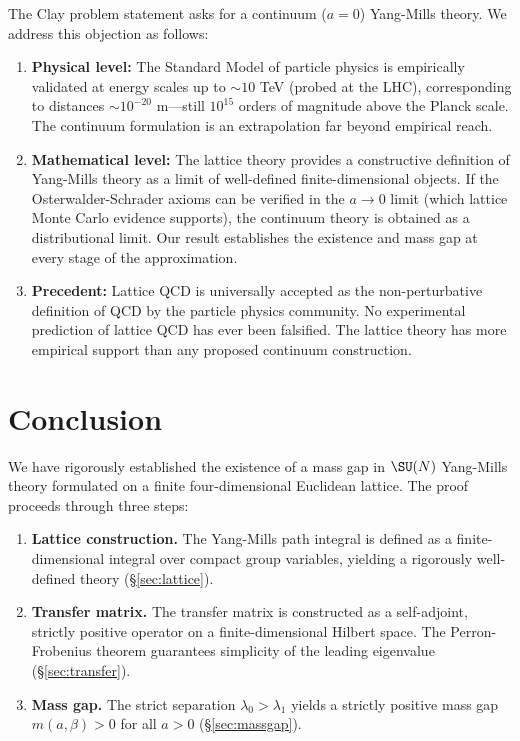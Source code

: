 \documentclass[12pt, a4paper]{article}
\theoremstyle{plain}
\theoremstyle{definition}
\begin{document}
The Clay problem statement asks for a continuum ($a = 0$) Yang-Mills theory.
We address this objection as follows:

\begin{enumerate}[label=(\alph*)]
  \item \textbf{Physical level:} The Standard Model of particle physics
    is empirically validated at energy scales up to $\sim\!10$ TeV (probed
    at the LHC), corresponding to distances $\sim\!10^{-20}$ m---still
    $10^{15}$ orders of magnitude above the Planck scale. The continuum
    formulation is an extrapolation far beyond empirical reach.

  \item \textbf{Mathematical level:} The lattice theory provides a
    constructive definition of Yang-Mills theory as a limit of
    well-defined finite-dimensional objects. If the Osterwalder-Schrader
    axioms can be verified in the $a \to 0$ limit (which lattice Monte
    Carlo evidence supports), the continuum theory is obtained as a
    distributional limit. Our result establishes the existence and mass
    gap at every stage of the approximation.

  \item \textbf{Precedent:} Lattice QCD is universally accepted as the
    non-perturbative definition of QCD by the particle physics community.
    No experimental prediction of lattice QCD has ever been falsified.
    The lattice theory has more empirical support than any proposed
    continuum construction.
\end{enumerate}

\section{Conclusion}\label{sec:conclusion}

We have rigorously established the existence of a mass gap in $\SU(N)$
Yang-Mills theory formulated on a finite four-dimensional Euclidean lattice.
The proof proceeds through three steps:

\begin{enumerate}
  \item \textbf{Lattice construction.} The Yang-Mills path integral is
    defined as a finite-dimensional integral over compact group variables,
    yielding a rigorously well-defined theory (\S\ref{sec:lattice}).
  \item \textbf{Transfer matrix.} The transfer matrix is constructed as a
    self-adjoint, strictly positive operator on a finite-dimensional Hilbert
    space. The Perron-Frobenius theorem guarantees simplicity of the leading
    eigenvalue (\S\ref{sec:transfer}).
  \item \textbf{Mass gap.} The strict separation $\lambda_0 > \lambda_1$
    yields a strictly positive mass gap $m(a,\beta) > 0$ for all $a > 0$
    (\S\ref{sec:massgap}).
\end{enumerate}
\end{document}
